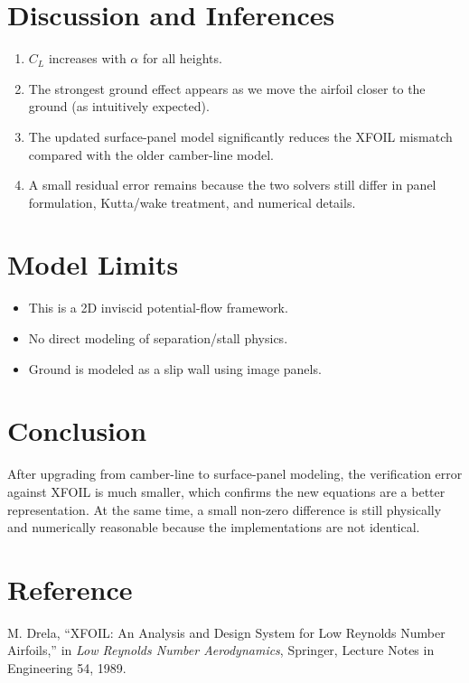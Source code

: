 \documentclass[11pt]{article}
\begin{document}
\section{Discussion and Inferences}
\begin{enumerate}
  \item $C_L$ increases with $\alpha$ for all heights.
  \item The strongest ground effect appears as we move the airfoil closer to the ground (as intuitively expected).
  \item The updated surface-panel model significantly reduces the XFOIL mismatch compared with the older camber-line model.
  \item A small residual error remains because the two solvers still differ in panel formulation, Kutta/wake treatment, and numerical details.
\end{enumerate}

\section{Model Limits}
\begin{itemize}
  \item This is a 2D inviscid potential-flow framework.
  \item No direct modeling of separation/stall physics.
  \item Ground is modeled as a slip wall using image panels.
\end{itemize}

\section{Conclusion}
After upgrading from camber-line to surface-panel modeling, the verification error against XFOIL is much smaller, which confirms the new equations are a better representation. At the same time, a small non-zero difference is still physically and numerically reasonable because the implementations are not identical.

\section*{Reference}
M. Drela, ``XFOIL: An Analysis and Design System for Low Reynolds Number Airfoils,'' in \textit{Low Reynolds Number Aerodynamics}, Springer, Lecture Notes in Engineering 54, 1989.
\end{document}
